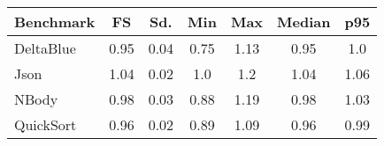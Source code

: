 \begin{center}
\begin{tabular}{l c c c c c c}
\toprule
\textbf{Benchmark} & \textbf{FS} & \textbf{Sd.} & \textbf{Min} & \textbf{Max} & \textbf{Median} & \textbf{p95}\\
\toprule

DeltaBlue & 0.95 & 0.04 & 0.75 & 1.13 & 0.95 & 1.0 \\
\midrule

Json & 1.04 & 0.02 & 1.0 & 1.2 & 1.04 & 1.06 \\
\midrule

NBody & 0.98 & 0.03 & 0.88 & 1.19 & 0.98 & 1.03 \\
\midrule

QuickSort & 0.96 & 0.02 & 0.89 & 1.09 & 0.96 & 0.99 \\
\midrule

\end{tabular}
\end{center}